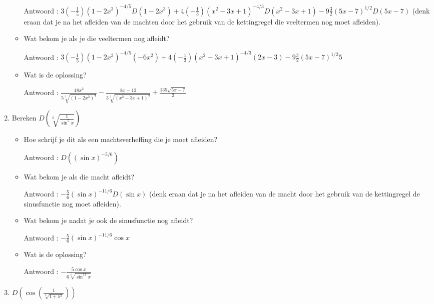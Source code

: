 \begin{enumerate}
\begin{itemize}
		Antwoord : $3\left(- \frac{1}{5} \right)\left( 1-2x^3  \right)^{-4/5}D\left( 1-2x^3  \right)+4\left( -\frac{1}{3}  \right)\left( x^2-3x+1  \right)^{-4/3}D\left( x^2-3x+1  \right)-9\frac{3}{2}\left( 5x-7  \right)^{1/2}D(5x-7)$ (denk eraan dat je na het afleiden van de machten door het gebruik van de kettingregel die veeltermen nog moet afleiden).
		
		\item Wat bekom je als je die veeltermen nog afleidt?
		
		Antwoord : $3\left(- \frac{1}{5} \right)\left( 1-2x^3  \right)^{-4/5}\left( -6x^2  \right)+4\left( -\frac{1}{3}  \right)\left( x^2-3x+1  \right)^{-4/3}\left(2 x-3  \right)-9\frac{3}{2}\left( 5x-7  \right)^{1/2}5$
		
		\item Wat is de oplossing?
		
		Antwoord : $\frac{18x^2}{5\sqrt[5]{\left( 1-2x^3 \right) ^4}}-\frac{8x-12}{3\sqrt[3]{\left( x^2-3x+1 \right)^4}}+\frac{135 \sqrt{5x-7}}{2}$
		
	\end{itemize}
	
	\item Bereken $D \left( \sqrt[6]{\frac{1}{\sin ^5x}}  \right)$
	
	\begin{itemize}
		
		\item Hoe schrijf je dit als een machtsverheffing die je moet afleiden?
		
		Antwoord : $D \left( (\sin x)^{-5/6}  \right)$
		
		\item Wat bekom je als die macht afleidt? 
		
		Antwoord : $-\frac{5}{6} (\sin x)^{-11/6} D(\sin x)$ (denk eraan dat je na het afleiden van de macht door het gebruik van de kettingregel de sinusfunctie nog moet afleiden).
		
		\item Wat bekom je nadat je ook de sinusfunctie nog afleidt?
		
		Antwoord : $-\frac{5}{6} (\sin x)^{-11/6} \cos x$
		
		\item Wat is de oplossing?
		
		Antwoord : $-\frac{5 \cos x}{6 \sqrt[6]{\sin ^{11}x}}$
		
	\end{itemize}
	
	\item $D \left( \cos \left( \frac {1}{\sqrt[3]{1+x^2}}  \right)  \right)$
	

\end{enumerate}

